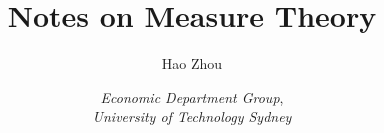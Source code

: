 \documentclass[a4paper,12pt]{book}
\begin{document}
\title{\Huge \textbf{Notes on Measure Theory}}
\author{\Large Hao Zhou}


\date{\textit{Economic Department Group}, \\\textit{University of Technology Sydney}}

\frontmatter

\maketitle
\setcounter{tocdepth}{1} %
\tableofcontents

\mainmatter

%

\backmatter
%
%
\end{document}
